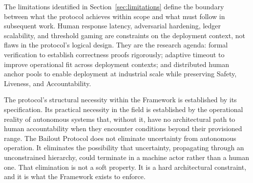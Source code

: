 The limitations identified in Section~\ref{sec:limitations} define the boundary between what the protocol achieves within scope and what must follow in subsequent work. Human response latency, adversarial hardening, ledger scalability, and threshold gaming are constraints on the deployment context, not flaws in the protocol's logical design. They are the research agenda: formal verification to establish correctness proofs rigorously; adaptive timeout to improve operational fit across deployment contexts; and distributed human anchor pools to enable deployment at industrial scale while preserving Safety, Liveness, and Accountability.

The protocol's structural necessity within the \bxthree{} Framework is established by its specification. Its practical necessity in the field is established by the operational reality of autonomous systems that, without it, have no architectural path to human accountability when they encounter conditions beyond their provisioned range. The Bailout Protocol does not eliminate uncertainty from autonomous operation. It eliminates the possibility that uncertainty, propagating through an unconstrained hierarchy, could terminate in a machine actor rather than a human one. That elimination is not a soft property. It is a hard architectural constraint, and it is what the \bxthree{} Framework exists to enforce.
